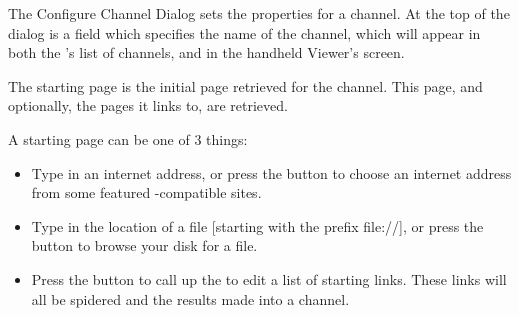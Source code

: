 

The Configure Channel Dialog sets the properties for a channel. At the top of
the dialog is a  field which specifies the name of
the channel, which will appear in both the \brandingapplicationdesktopname's list of channels,
and in the handheld Viewer's  screen.



The starting page is the initial page retrieved for the channel. This page,
and optionally, the pages it links to, are retrieved.

A starting page can be one of 3 things:

\begin{itemize}
  \item {} Type in an internet address, or press 
  the  button to choose an internet address 
  from some featured \brandingapplicationsuitename-compatible sites.

  \item {} Type in the location of a file [starting 
  with the prefix file://], or press the  button 
  to browse your disk for a file.

  \item {} Press the
   button to call up the
  \helpignore{\ref{sec:pd-editor-dialog}}
  to edit a list of starting links. These links will all be spidered and the
  results made into a channel.
\end{itemize}

